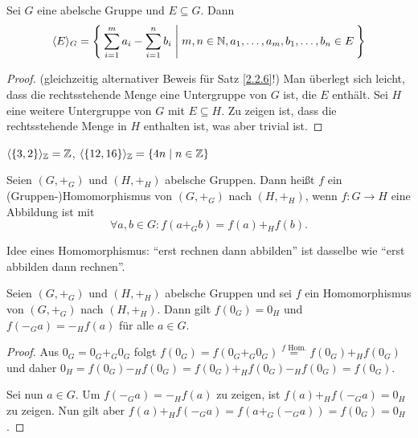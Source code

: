 \documentclass[../../main.tex]{subfiles}
\begin{document}
\begin{sat}\label{2.2.7}
Sei $G$ eine abelsche Gruppe und $E\subseteq G$. Dann
$$\langle E\rangle_G = \Set{\sum_{i=1}^{m}a_i-\sum_{i=1}^{n}b_i | m,n\in\mathbb N, a_1,\ldots,a_m,b_1,\ldots,b_n\in E}$$
\end{sat}
\begin{proof}(gleichzeitig alternativer Beweis für Satz \ref{2.2.6}!)
Man überlegt sich leicht, dass die rechtsstehende Menge eine Untergruppe von $G$ ist, die $E$ enthält. Sei $H$ eine
weitere Untergruppe von $G$ mit $E\subseteq H$. Zu zeigen ist, dass die rechtsstehende Menge in $H$ enthalten ist,
was aber trivial ist.
\end{proof}

\begin{bsp}\label{2.2.8}
$\langle \left\{3,2\right\}\rangle_\mathbb Z = \mathbb Z$, $\langle\{12,16\}\rangle_\mathbb Z=\{4n\mid n\in\mathbb Z\}$
\end{bsp}

\begin{df}\label{2.2.9}
Seien $(G,+_G)$ und $(H,+_H)$ abelsche Gruppen. Dann heißt $f$ ein \mbox{(Gruppen-)}Homo\-morphismus von $(G,+_G)$ nach
$(H,+_H)$, wenn $f\colon G\to H$ eine Abbildung ist mit \[\forall a,b\in G: f(a+_Gb)=f(a)+_Hf(b).\]
\end{df}

\begin{ged}\label{2.2.10}
Idee eines Homomorphismus: "`erst rechnen dann abbilden"' ist dasselbe wie "`erst abbilden dann rechnen"'.
\end{ged}

\begin{pro}\label{2.2.11}
Seien $(G,+_G)$ und $(H,+_H)$ abelsche Gruppen und sei $f$ ein Homomorphismus von
$(G,+_G)$ nach $(H,+_H)$. Dann gilt $f(0_G)=0_H$ und $f(-_G a)=-_Hf(a)$ für alle $a\in G$.
\end{pro}
\begin{proof}
Aus $0_G=0_G +_G 0_G$ folgt $f(0_G)=f(0_G +_G 0_G)\overset{\text{$f$ Hom.}}=f(0_G) +_H f(0_G)$ und daher $0_H = f(0_G) -_H f(0_G) = f(0_G) +_H f(0_G) -_H f(0_G)=f(0_G)$.

Sei nun $a\in G$. Um $f(-_G a) = -_H f(a)$ zu zeigen, ist $f(a)+_H f(-_G a) = 0_H$ zu zeigen.
Nun gilt aber $f(a)+_H f(-_G a)= f(a +_G (-_G a)) = f(0_G) = 0_H$.
\end{proof}
\end{document}
